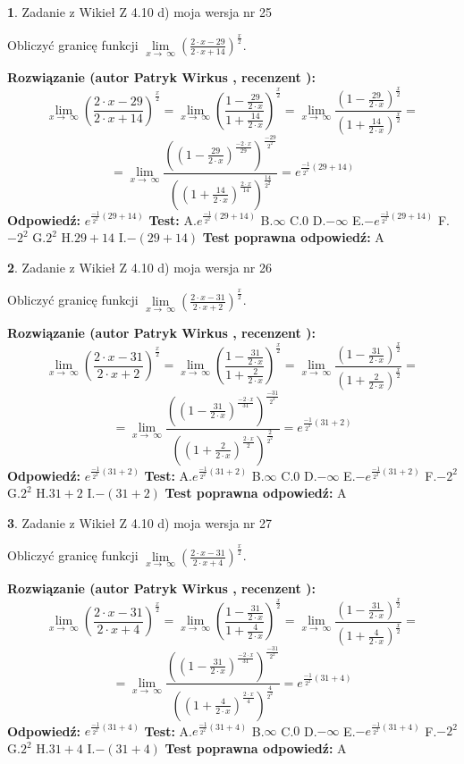 \documentclass[12pt, a4paper]{article}
\theoremstyle{definition} %
\newtheorem{zad}{}
\newcommand{\zadStart}[1]{\begin{zad}#1\newline}
\newcommand{\zadStop}{\end{zad}}
\newcommand{\rozwStart}[2]{\noindent \textbf{Rozwiązanie (autor #1 , recenzent #2): }\newline}
\newcommand{\rozwStop}{\newline}
\newcommand{\odpStart}{\noindent \textbf{Odpowiedź:}\newline}
\newcommand{\odpStop}{\newline}
\newcommand{\testStart}{\noindent \textbf{Test:}\newline}
\newcommand{\testStop}{\newline}
\newcommand{\kluczStart}{\noindent \textbf{Test poprawna odpowiedź:}\newline}
\newcommand{\kluczStop}{\newline}
\begin{document}
\zadStart{Zadanie z Wikieł Z 4.10 d) moja wersja nr 25}


Obliczyć granicę funkcji  $\lim\limits_{x\to\ \infty}(\frac{2\cdot x-29}{2\cdot x+14})^{\frac{x}{2}}$.
\zadStop
\rozwStart{Patryk Wirkus}{}
$$\lim\limits_{x\to\ \infty}(\frac{2\cdot x-29}{2\cdot x+14})^{\frac{x}{2}} = \lim\limits_{x\to\ \infty}(\frac{1-\frac{29}{2\cdot x}}{1+\frac{14}{2\cdot x}})^{\frac{x}{2}}=\lim\limits_{x\to\ \infty}\frac{(1-\frac{29}{2\cdot x})^{\frac{x}{2}}}{(1+\frac{14}{2\cdot x})^{\frac{x}{2}}}=$$
$$=\lim\limits_{x\to\ \infty}\frac{((1-\frac{29}{2\cdot x})^{\frac{-2\cdot x}{29}})^{\frac{-29}{2^{2}}}}{((1+\frac{14}{2\cdot x})^{\frac{2\cdot x}{14}})^{\frac{14}{2^{2}}}}=e^{\frac{-1}{2^{2}}(29+14)}$$
\rozwStop
\odpStart
$e^{\frac{-1}{2^{2}}(29+14)}$
\odpStop
\testStart
A.$e^{\frac{-1}{2^{2}}(29+14)}$ B.$\infty$ C.$0$ D.$-\infty$ E.$-e^{\frac{-1}{2^{2}}(29+14)}$
F.$-2^{2}$ G.$2^{2}$
H.$29+14$
I.$-(29+14)$
\testStop
\kluczStart
A
\kluczStop



\zadStart{Zadanie z Wikieł Z 4.10 d) moja wersja nr 26}


Obliczyć granicę funkcji  $\lim\limits_{x\to\ \infty}(\frac{2\cdot x-31}{2\cdot x+2})^{\frac{x}{2}}$.
\zadStop
\rozwStart{Patryk Wirkus}{}
$$\lim\limits_{x\to\ \infty}(\frac{2\cdot x-31}{2\cdot x+2})^{\frac{x}{2}} = \lim\limits_{x\to\ \infty}(\frac{1-\frac{31}{2\cdot x}}{1+\frac{2}{2\cdot x}})^{\frac{x}{2}}=\lim\limits_{x\to\ \infty}\frac{(1-\frac{31}{2\cdot x})^{\frac{x}{2}}}{(1+\frac{2}{2\cdot x})^{\frac{x}{2}}}=$$
$$=\lim\limits_{x\to\ \infty}\frac{((1-\frac{31}{2\cdot x})^{\frac{-2\cdot x}{31}})^{\frac{-31}{2^{2}}}}{((1+\frac{2}{2\cdot x})^{\frac{2\cdot x}{2}})^{\frac{2}{2^{2}}}}=e^{\frac{-1}{2^{2}}(31+2)}$$
\rozwStop
\odpStart
$e^{\frac{-1}{2^{2}}(31+2)}$
\odpStop
\testStart
A.$e^{\frac{-1}{2^{2}}(31+2)}$ B.$\infty$ C.$0$ D.$-\infty$ E.$-e^{\frac{-1}{2^{2}}(31+2)}$
F.$-2^{2}$ G.$2^{2}$
H.$31+2$
I.$-(31+2)$
\testStop
\kluczStart
A
\kluczStop



\zadStart{Zadanie z Wikieł Z 4.10 d) moja wersja nr 27}


Obliczyć granicę funkcji  $\lim\limits_{x\to\ \infty}(\frac{2\cdot x-31}{2\cdot x+4})^{\frac{x}{2}}$.
\zadStop
\rozwStart{Patryk Wirkus}{}
$$\lim\limits_{x\to\ \infty}(\frac{2\cdot x-31}{2\cdot x+4})^{\frac{x}{2}} = \lim\limits_{x\to\ \infty}(\frac{1-\frac{31}{2\cdot x}}{1+\frac{4}{2\cdot x}})^{\frac{x}{2}}=\lim\limits_{x\to\ \infty}\frac{(1-\frac{31}{2\cdot x})^{\frac{x}{2}}}{(1+\frac{4}{2\cdot x})^{\frac{x}{2}}}=$$
$$=\lim\limits_{x\to\ \infty}\frac{((1-\frac{31}{2\cdot x})^{\frac{-2\cdot x}{31}})^{\frac{-31}{2^{2}}}}{((1+\frac{4}{2\cdot x})^{\frac{2\cdot x}{4}})^{\frac{4}{2^{2}}}}=e^{\frac{-1}{2^{2}}(31+4)}$$
\rozwStop
\odpStart
$e^{\frac{-1}{2^{2}}(31+4)}$
\odpStop
\testStart
A.$e^{\frac{-1}{2^{2}}(31+4)}$ B.$\infty$ C.$0$ D.$-\infty$ E.$-e^{\frac{-1}{2^{2}}(31+4)}$
F.$-2^{2}$ G.$2^{2}$
H.$31+4$
I.$-(31+4)$
\testStop
\kluczStart
A
\kluczStop
\end{document}
